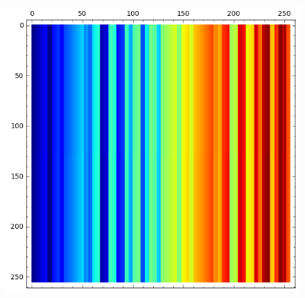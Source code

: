 \documentclass[pdf,sprung,slideColor,nocolorBG]{beamer}
\newenvironment{colortheme}[1]{
\def\ProvidesPackageRCS $##1${\relax}
\renewcommand{\ProcessOptions}{\relax}
\makeatletter

\makeatother
}{}
\begin{document}
\begin{colortheme}{jubata}
\begin{frame}
\begin{figure}
\begin{minipage}{.48\textwidth}
\includegraphics[width=.9\linewidth]{../matrix_plot/cast128_2_16_bent_cayley_graph_index_matrix.png}
  \label{fig:cast128_2_16_bent_cayley_graph_index_matrix}
\end{minipage}%
\end{figure}
\end{frame}


\end{colortheme}
\end{document}
